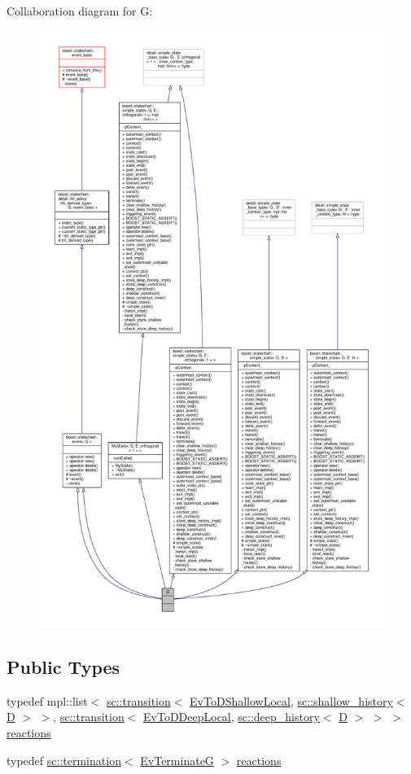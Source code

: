 Collaboration diagram for G\+:
\nopagebreak
\begin{figure}[H]
\begin{center}
\leavevmode
\includegraphics[height=550pt]{struct_g__coll__graph}
\end{center}
\end{figure}
\subsection*{Public Types}
\begin{DoxyCompactItemize}
\item 
typedef mpl\+::list$<$ \mbox{\hyperlink{classboost_1_1statechart_1_1transition}{sc\+::transition}}$<$ \mbox{\hyperlink{struct_ev_to_d_shallow_local}{Ev\+To\+D\+Shallow\+Local}}, \mbox{\hyperlink{classboost_1_1statechart_1_1shallow__history}{sc\+::shallow\+\_\+history}}$<$ \mbox{\hyperlink{struct_d}{D}} $>$ $>$, \mbox{\hyperlink{classboost_1_1statechart_1_1transition}{sc\+::transition}}$<$ \mbox{\hyperlink{struct_ev_to_d_deep_local}{Ev\+To\+D\+Deep\+Local}}, \mbox{\hyperlink{classboost_1_1statechart_1_1deep__history}{sc\+::deep\+\_\+history}}$<$ \mbox{\hyperlink{struct_d}{D}} $>$ $>$ $>$ \mbox{\hyperlink{struct_g_a27263c2aae05b19d5203310e40fb0520}{reactions}}
\item 
typedef \mbox{\hyperlink{classboost_1_1statechart_1_1termination}{sc\+::termination}}$<$ \mbox{\hyperlink{struct_ev_terminate_g}{Ev\+TerminateG}} $>$ \mbox{\hyperlink{struct_g_a74380ed290a92cb7d62606d3ef31ce4d}{reactions}}
\end{DoxyCompactItemize}
